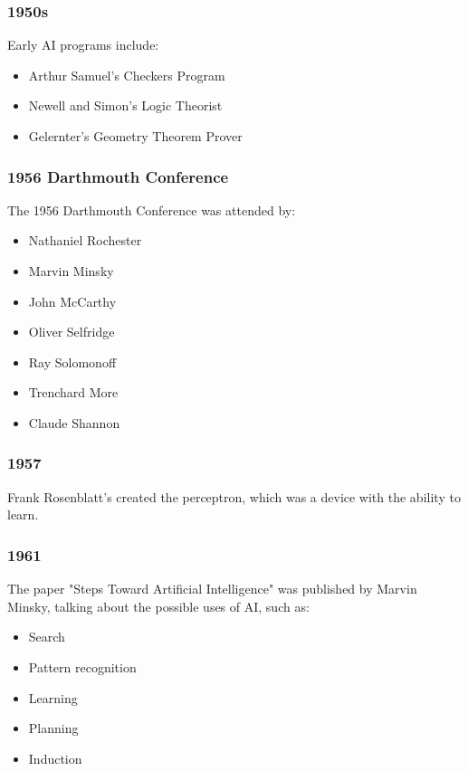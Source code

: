 \documentclass[11pt]{article}
\begin{document}
 \newpage
\subsubsection{1950s}
\label{sec:org2522679}
Early AI programs include:
\begin{itemize}
\item Arthur Samuel's Checkers Program
\item Newell and Simon's Logic Theorist
\item Gelernter's Geometry Theorem Prover
\end{itemize}
\subsubsection{1956 Darthmouth Conference}
\label{sec:orga18c918}
The 1956 Darthmouth Conference was attended by:
\begin{itemize}
\item Nathaniel Rochester
\item Marvin Minsky
\item John McCarthy
\item Oliver Selfridge
\item Ray Solomonoff
\item Trenchard More
\item Claude Shannon
\end{itemize}
\subsubsection{1957}
\label{sec:orge218bfa}
Frank Rosenblatt's created the perceptron, which was a device with the ability to learn.
\subsubsection{1961}
\label{sec:orgaf7ec7a}
The paper "Steps Toward Artificial Intelligence" was published by Marvin Minsky, talking about the possible uses of AI, such as:
\begin{itemize}
\item Search
\item Pattern recognition
\item Learning
\item Planning
\item Induction
\end{itemize}
\end{document}
